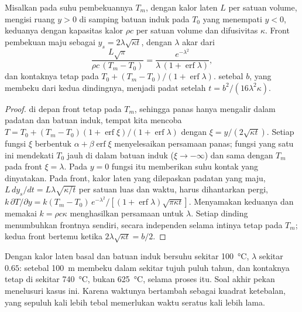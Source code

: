 \begin{proposition}\label{prop:b2:magma-emplacement:stefan}
Misalkan  pada suhu pembekuannya $T_m$, dengan kalor laten $L$ per satuan
volume, mengisi ruang $y > 0$ di samping batuan induk pada $T_0$ yang menempati $y < 0$, keduanya
dengan kapasitas kalor $\rho c$ per satuan volume dan difusivitas $\kappa$. Front
pembekuan maju sebagai $y_s = 2\lambda\sqrt{\kappa t}$, dengan $\lambda$
akar dari
\[
\frac{L\sqrt\pi}{\rho c\,(T_m - T_0)} = \frac{e^{-\lambda^2}}{\lambda\,(1 + \operatorname{erf}\lambda)},
\]
dan kontaknya tetap pada $T_0 + (T_m - T_0)/(1 + \operatorname{erf}\lambda)$. 
setebal $b$, yang membeku dari kedua dindingnya, menjadi padat setelah
$t = b^2/(16\lambda^2\kappa)$.
\end{proposition}

\begin{proof}
 di depan front tetap pada $T_m$, sehingga panas hanya mengalir dalam padatan
dan batuan induk, tempat kita mencoba $T = T_0 + (T_m - T_0)(1 + \operatorname{erf}\xi)/(1 +
\operatorname{erf}\lambda)$ dengan $\xi = y/(2\sqrt{\kappa t})$. Setiap fungsi $\xi$
berbentuk $\alpha + \beta\operatorname{erf}\xi$ menyelesaikan persamaan panas; fungsi yang satu ini
mendekati $T_0$ jauh di dalam batuan induk ($\xi \to -\infty$) dan sama dengan $T_m$ pada front
$\xi = \lambda$. Pada $y = 0$ fungsi itu memberikan suhu kontak yang dinyatakan. Pada front,
kalor laten yang dilepaskan padatan yang maju, $L\,dy_s/dt = L\lambda\sqrt{\kappa/t}$
per satuan luas dan waktu, harus dihantarkan pergi, $k\,\partial T/\partial y = k(T_m -
T_0)\,e^{-\lambda^2}/[(1 + \operatorname{erf}\lambda)\sqrt{\pi\kappa t}]$. Menyamakan
keduanya dan memakai $k = \rho c\kappa$ menghasilkan persamaan untuk $\lambda$. Setiap dinding
 menumbuhkan frontnya sendiri, secara independen selama intinya tetap pada $T_m$; kedua
front bertemu ketika $2\lambda\sqrt{\kappa t} = b/2$.
\end{proof}

Dengan kalor laten basal dan batuan induk bersuhu sekitar \qty{100}{\celsius},
$\lambda$ sekitar $0.65$:  setebal \qty{100}{m} membeku dalam sekitar
tujuh puluh tahun, dan kontaknya tetap di sekitar \qty{740}{\celsius}, bukan
\qty{625}{\celsius}, selama proses itu. Soal akhir pekan menelusuri kasus ini.
Karena waktunya bertambah sebagai kuadrat ketebalan,  yang sepuluh kali lebih tebal
memerlukan waktu seratus kali lebih lama.

